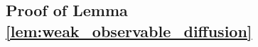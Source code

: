 \subsection{Proof of Lemma \ref{lem:weak_observable_diffusion}}
\label{sec:proof_weak_observable_diffusion}

